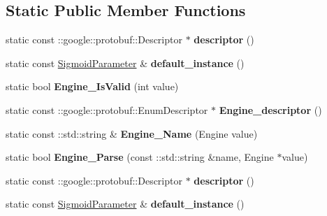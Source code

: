 \subsection*{Static Public Member Functions}
\begin{DoxyCompactItemize}
\item 
\mbox{\label{classcaffe_1_1_sigmoid_parameter_a31238ec597b6084aa63715b0eb93755f}} 
static const \+::google\+::protobuf\+::\+Descriptor $\ast$ {\bfseries descriptor} ()
\item 
\mbox{\label{classcaffe_1_1_sigmoid_parameter_a6880d2600dcf4c7f808ab79d0993cfaf}} 
static const \mbox{\hyperlink{classcaffe_1_1_sigmoid_parameter}{Sigmoid\+Parameter}} \& {\bfseries default\+\_\+instance} ()
\item 
\mbox{\label{classcaffe_1_1_sigmoid_parameter_abd046e1bced8772a81d2e888b936103e}} 
static bool {\bfseries Engine\+\_\+\+Is\+Valid} (int value)
\item 
\mbox{\label{classcaffe_1_1_sigmoid_parameter_a25f7229e9ba77f0c908a7fdf78d8a759}} 
static const \+::google\+::protobuf\+::\+Enum\+Descriptor $\ast$ {\bfseries Engine\+\_\+descriptor} ()
\item 
\mbox{\label{classcaffe_1_1_sigmoid_parameter_a3ee655453aae693899b4fbd628726ac5}} 
static const \+::std\+::string \& {\bfseries Engine\+\_\+\+Name} (Engine value)
\item 
\mbox{\label{classcaffe_1_1_sigmoid_parameter_a2acb0cd957d731158b8d667deadc2fb5}} 
static bool {\bfseries Engine\+\_\+\+Parse} (const \+::std\+::string \&name, Engine $\ast$value)
\item 
\mbox{\label{classcaffe_1_1_sigmoid_parameter_a8f39fe66733ec0611943168eda7c0931}} 
static const \+::google\+::protobuf\+::\+Descriptor $\ast$ {\bfseries descriptor} ()
\item 
\mbox{\label{classcaffe_1_1_sigmoid_parameter_a8b7f1813550c93b5cafeb51eff5491f0}} 
static const \mbox{\hyperlink{classcaffe_1_1_sigmoid_parameter}{Sigmoid\+Parameter}} \& {\bfseries default\+\_\+instance} ()

\end{DoxyCompactItemize}

